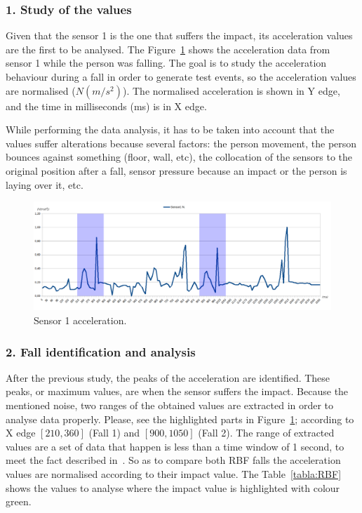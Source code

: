 \documentclass[conference]{IEEEtran}
\theoremstyle{definition}
\begin{document}
\subsubsection*{1. Study of the values} Given that the sensor 1 is the one that suffers the
impact, its acceleration values are the first to be analysed. The Figure~\ref{fig:Sensor1Sombras} 
shows the acceleration data from sensor 1 while the person was falling. The goal is to study 
the acceleration behaviour during a fall in order to generate test events, so the acceleration 
values are normalised ($N(m/s^2)$). The normalised acceleration is shown in Y edge, and the 
time in milliseconds (ms) is in X edge.

While performing the data analysis, it has to be taken into account that the values suffer 
alterations because several factors: the person movement, the person bounces against something 
(floor, wall, etc), the collocation of the sensors to the original position after a fall, 
sensor pressure because an impact or the person is laying over it, etc.

 \begin{figure}[!h]
  \includegraphics[scale=0.375]{Sensor1Sombras}
  \caption[Sensor 1 acceleration]{Sensor 1 acceleration.}
  \label{fig:Sensor1Sombras}
\end{figure}

\subsubsection*{2. Fall identification and analysis} After the previous study, the peaks of the acceleration are identified. 
These peaks, or maximum values, are when the sensor suffers the impact. Because the mentioned noise, two ranges of the obtained 
values are extracted in order to analyse data properly. Please, see the highlighted parts in Figure~\ref{fig:Sensor1Sombras};
according to X edge $[210, 360]$ (Fall 1) and $[900, 1050]$ (Fall 2). The range of extracted values are a set of data that 
happen is less than a time window of 1 second, to meet the fact described in~\cite{Luder2009}. So as to compare both RBF falls
the acceleration values are normalised according to their impact value. The Table~\ref{tabla:RBF} 
shows the values to analyse where the impact value is highlighted with colour green.
\end{document}
